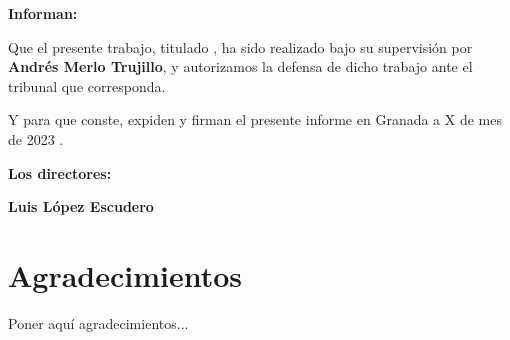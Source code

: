 

\vspace{0.5cm}

\textbf{Informan:}

\vspace{0.5cm}

Que el presente trabajo, titulado \textit{\textbf{\myTitle}},
ha sido realizado bajo su supervisión por \textbf{Andrés Merlo Trujillo}, y autorizamos la defensa de dicho trabajo ante el tribunal
que corresponda.

\vspace{0.5cm}

Y para que conste, expiden y firman el presente informe en Granada a X de mes de 2023 .

\vspace{1cm}

\textbf{Los directores:}

\vspace{5cm}

\noindent \textbf{Luis López Escudero}%

\chapter*{Agradecimientos}
\thispagestyle{empty}

       \vspace{1cm}


Poner aquí agradecimientos...

